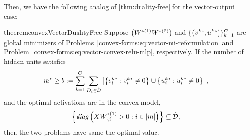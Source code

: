 Then, we have the following analog of \cref{thm:duality-free} for the vector-output case:
\begin{restatable}{theorem}{convexVectorDualityFree}\label{thm:vector-duality-free}
    Suppose \(\left(W^{*(1)} W^{*(2)}\right)\) and \( \{\left(v^{k*}, u^{k*}\right)\}_{k=1}^C \) are global minimizers of Problems~\ref{convex-forms:eq:vector-mi-reformulation} and Problem~\ref{convex-forms:eq:vector-convex-relu-mlp}, respectively.
    If the number of hidden units satisfies
    \[
        m^* \geq b
        := \sum_{k=1}^C \sum_{D_i \in \tilde {\mathcal{D}}} \left\vert \left\{v^{k*}_i : v^{k*}_i \neq 0\right\}
            \cup \left\{u^{k*}_i : u^{k*}_i \neq 0\right\} \right\vert,
    \]
    and the optimal activations are in the convex model,
    \[ \left\{\text{\emph{diag}}\left(X W^{*(1)}_{\cdot, i} > 0 : i \in [m]\right) \right\} \subseteq \tilde {\mathcal{D}}, \]
    then the two problems have same the optimal value.
\end{restatable}

